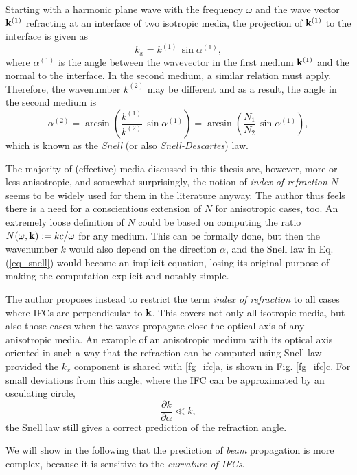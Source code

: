 Starting with a harmonic plane wave with the frequency $\omega$ and the wave vector ${\mathbf{k}}^{(1)}$ refracting at an interface of two isotropic media, the projection of ${\mathbf{k}}^{(1)}$ to the interface is given as 
$$ k_x = k^{(1)}\,\sin \alpha^{(1)}, $$
where $\alpha^{(1)}$ is the angle between the wavevector in the first medium ${\mathbf{k}}^{(1)}$ and the  normal to the interface. In the second medium, a similar relation must apply. Therefore, the wavenumber $k^{(2)}$ may be different and as a result, the angle in the second medium is
\begin{equation} \alpha^{(2)} = \arcsin\left( \frac{k^{(1)}}{k^{(2)}} \,\sin \alpha^{(1)} \right) = \arcsin\left( \frac{N_1}{N_2} \,\sin \alpha^{(1)} \right), \label{eq_snell}\end{equation}
which is known as the \textit{Snell} (or also \textit{Snell-Descartes}) law.

The majority of (effective) media discussed in this thesis are, however, more or less anisotropic, and somewhat surprisingly, the notion of \textit{index of refraction} $N$ seems to be widely used for them in the literature anyway. The author thus feels there is a need for a conscientious extension of $N$ for anisotropic cases, too. An extremely loose definition of $N$ could be based on computing the ratio $N(\omega, {\mathbf{k}}) := kc/\omega$  for any medium. This can be formally done, but then the wavenumber $k$ would also depend on the direction $\alpha$, and the Snell law in Eq. (\ref{eq_snell}) would become an implicit equation, losing its original purpose of making the computation explicit and notably simple.

The author proposes instead to restrict the term \textit{index of refraction} to all cases where IFCs are perpendicular to ${\mathbf{k}}$. This covers not only all isotropic media, but also those cases when the waves propagate close the optical axis of any anisotropic media. An example of an anisotropic medium with its optical axis oriented in such a way that the refraction can be computed using Snell law provided the $k_x$ component is shared with \ref{fg_ifc}a, is shown in Fig. \ref{fg_ifc}c. For small deviations from this angle, where the IFC can be approximated by an osculating circle, 
\begin{equation} \frac{\partial k}{\partial \alpha} \ll k,\label{eq_osculating}\end{equation}
the Snell law still gives a correct prediction of the refraction angle. 

We will show in the following that the prediction of \textit{beam} propagation is more complex, because it is sensitive to the \textit{curvature of IFCs}. 

